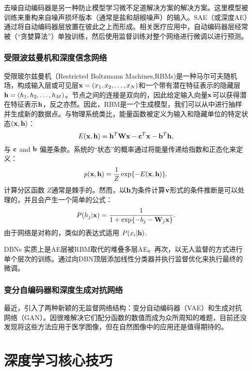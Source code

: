 去噪自动编码器\citep{Vincent2010Stacked}是另一种防止模型学习微不足道解决方案的解决方案。这里模型被训练来重构来自噪声损坏版本（通常是盐和胡椒噪声）的输入。SAE（或深度AE）通过将自动编码器层放置在彼此之上而形成。相关医疗应用中，自动编码器层经常被（“贪婪算法”）单独训练，然后使用监督训练对整个网络进行微调以进行预测。

\subsubsection{受限波兹曼机和深度信念网络}
受限玻尔兹曼机（Restricted Boltzmann Machines,RBMs)\citep{Hinton2006a}是一种马尔可夫随机场，构成输入层或可见层${\bf x} = (x_{1}, x_{2}, \ldots, x_{N})$和一个带有潜在特征表示的隐藏层${\bf h} = (h_{1}, h_{2}, \ldots, h_{M})$。节点之间的连接是双向的，因此给定输入向量$\bf x$可以获得潜在特征表示$\bf h$，反之亦然。因此，RBM是一个生成模型，我们可以从中进行抽样并生成新的数据点。与物理系统类比，能量函数被定义为输入和隐藏单位的特定状态$({\bf x}, {\bf h})$：
\begin{equation}
 E({\bf x}, {\bf h}) = {\bf h}^{T}{\bf W}{\bf x} - {\bf c}^{T}{\bf x} - {\bf b}^{T}{\bf h},
\end{equation}
与 ${\bf c}$ and ${\bf b}$ 偏差条款。系统的“状态”的概率通过将能量传递给指数和正态化来定义：
\begin{equation}
 p({\bf x}, {\bf h}) = \frac{1}{Z} \exp\{ - E({\bf x}, {\bf h}) \}.
\end{equation}
计算分区函数 $Z$通常是棘手的。然而，以${\bf h}$为条件计算${\bf v}$形式的条件推断是可以处理的，并且会产生一个简单的公式：
\begin{equation}
 P(h_{j} | {\bf x}) = \frac{1}{ 1 + \exp\{ -b_{j} - {\bf W}_{j}{\bf x}\} }.
\end{equation}
由于网络是对称的，类似的表达式适用 $P(x_{i} | {\bf h})$.

DBNs \citep{Hinton2009Deep}实质上是AE层被RBM取代的堆叠多层AE。再次，以无人监督的方式进行单个层次的训练。通过向DBN顶层添加线性分类器并执行监督优化来执行最终的微调。
\subsubsection{变分自编码器和深度生成对抗网络}
最近，引入了两种新颖的无监督网络结构：变分自动编码器（VAE）\citep{Kingma2013Auto}和生成对抗网络（GAN）\citep{Goodfellow2014Generative}。因很难解决它们配分函数的数值而成为众所周知的难题，目前还没发现将这些方法应用于医学图像，但在自然图像中的应用还是值得期待的。

\section{深度学习核心技巧}
